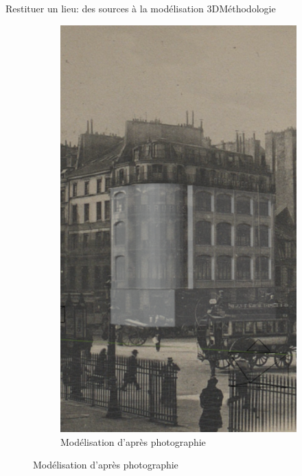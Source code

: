 \documentclass[8pt]{beamer}
\begin{document}
\begin{frame}{Restituer un lieu: des sources à la modélisation 3D}{Méthodologie}
\begin{figure}
\begin{subfigure}{0.23\textwidth}
			\includegraphics[width=\textwidth]{includes/c_slide9_3.png}
			\caption{Modélisation d'après photographie}
		\end{subfigure}
	\end{figure}
\end{frame}
\end{document}
